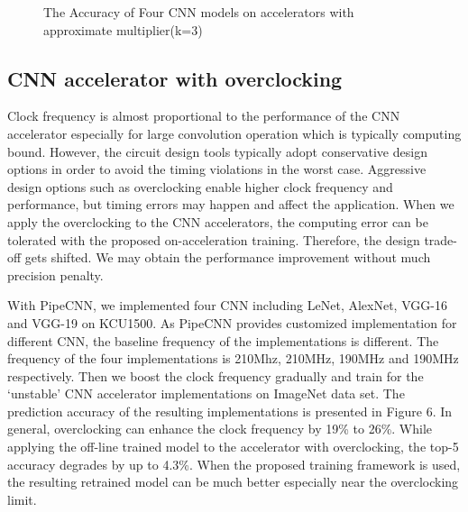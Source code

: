 \begin{figure}
        \center
        \qquad
        \caption{The Accuracy of Four CNN models on accelerators with approximate multiplier(k=3)}
        \label{fig:k3-approximate-mltiplier}
\end{figure}

\subsection{CNN accelerator with overclocking}
Clock frequency is almost proportional to the performance of the CNN accelerator 
especially for large convolution operation which is typically computing bound. 
However, the circuit design tools typically adopt conservative design options 
in order to avoid the timing violations in the worst case. Aggressive design options
such as overclocking enable higher clock frequency and performance, but 
timing errors may happen and affect the application. When we apply the overclocking 
to the CNN accelerators, the computing error can be tolerated with the proposed 
on-acceleration training. Therefore, the design trade-off gets shifted. We may 
obtain the performance improvement without much precision penalty.


  With PipeCNN, we implemented four CNN including LeNet, AlexNet, VGG-16 and VGG-19 on KCU1500. 
As PipeCNN provides customized implementation for different CNN, the baseline frequency of the implementations 
is different. The frequency of the four implementations is 210Mhz, 210MHz, 190MHz and 190MHz respectively. 
Then we boost the clock frequency gradually and train for the ‘unstable’ CNN accelerator implementations on 
ImageNet data set.  The prediction accuracy of the resulting implementations is presented in Figure 6. In general, 
overclocking can enhance the clock frequency by 19\% to 26\%. While applying the off-line trained model 
to the accelerator with overclocking, the top-5 accuracy degrades by up to 4.3\%. When the proposed training 
framework is used, the resulting retrained model can be much better especially near the overclocking limit.

